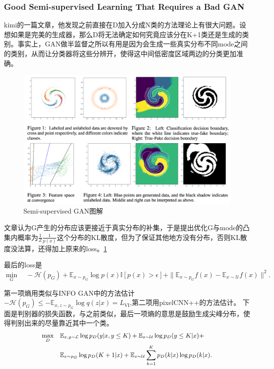 \documentclass[a4paper]{article}
\begin{document}
\subsubsection{Good Semi-supervised Learning That Requires a Bad GAN\cite{DBLP:journals/corr/DaiYYCS17}}
kimi的一篇文章，他发现之前直接在D加入分成N类的方法理论上有很大问题。设想如果是完美的生成器，那么D将无法确定如何究竟应该分在K+1类还是生成的类别。事实上，GAN做半监督之所以有用是因为会生成一些真实分布不同mode之间的类别，从而让分类器将这些分辨开，使得这中间低密度区域两边的分类更加准确。
\begin{figure}
\centering
\includegraphics[width=\textwidth]{./img/33.png}
\caption{Semi-supervised GAN图解}
\label{fig:33}
\end{figure}
文章认为G产生的分布应该更接近于真实分布的补集，于是提出优化G与mode的凸集内概率为$\frac{1}{Z}\frac{1}{p(x)}$这个分布的KL散度，但为了保证其他地方没有分布，否则KL散度没法算，还得加上原来的loss。\ref{fig:33}

最后的loss是$$\min_G \quad -\mathcal{H}(p_G) + \mathbb{E}_{x \sim p_G} \log p(x) \mathbb{I}[p(x) > \epsilon]  + \|\mathbb{E}_{x \sim p_G} f(x) - \mathbb{E}_{x \sim \mathcal{U}} f(x)\|^2.
$$

第一项熵用类似与INFO GAN中的方法估计$-\mathcal{H}(p_G) \leq - \mathbb{E}_{x, z \sim p_G} \log q(z | x) = L_\text{VI}$,第二项用pixelCNN++\cite{DBLP:journals/corr/SalimansKCK17}的方法估计。
下面是判别器的损失函数，与之前类似，最后一项熵的意思是鼓励生成尖峰分布，使得判别出来的尽量靠近其中一个类。
\begin{equation}
\small
\begin{aligned}
\max_{D} \quad
& \mathbb{E}_{x, y \sim \mathcal{L}} \log p_D(y | x, y \leq K) + \mathbb{E}_{x \sim \mathcal{U}} \log p_D(y \leq K | x) + \\
& \mathbb{E}_{x \sim p_G} \log p_D(K + 1 | x)  + \mathbb{E}_{x \sim \mathcal{U}} \sum_{k = 1}^K p_D(k | x) \log p_D(k | x).
\label{eq:d_full}
\end{aligned}
\end{equation}
\end{document}
